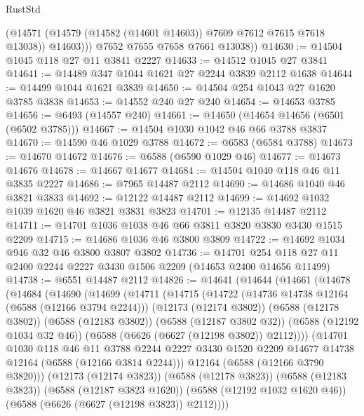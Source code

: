 \begin{lexlean}{RustStd}
\begin{coremodule}
              (@14571 (@14579 (@14582 (@14601 @14603)) @7609 @7612 @7615 @7618 @13038))
              @14603)))
        @7652
        @7655
        @7658
        @7661
        @13038))
@14630 := @14504 @1045 @118 @27 @11 @3841 @2227
@14633 := @14512 @1045 @27 @3841
@14641 := @14489 @347 @1044 @1621 @27 @2244 @3839 @2112 @1638
@14644 := @14499 @1044 @1621 @3839
@14650 := @14504 @254 @1043 @27 @1620 @3785 @3838
@14653 := @14552 @240 @27 @240
@14654 := @14653 @3785
@14656 := @6493 (@14557 @240)
@14661 := @14650 (@14654 @14656 (@6501 (@6502 @3785)))
@14667 := @14504 @1030 @1042 @46 @66 @3788 @3837
@14670 := @14590 @46 @1029 @3788
@14672 := @6583 (@6584 @3788)
@14673 := @14670 @14672
@14676 := @6588 (@6590 @1029 @46)
@14677 := @14673 @14676
@14678 := @14667 @14677
@14684 := @14504 @1040 @118 @46 @11 @3835 @2227
@14686 := @7965 @14487 @2112
@14690 := @14686 @1040 @46 @3821 @3833
@14692 := @12122 @14487 @2112
@14699 := @14692 @1032 @1039 @1620 @46 @3821 @3831 @3823
@14701 := @12135 @14487 @2112
@14711 := @14701 @1036 @1038 @46 @66 @3811 @3820 @3830 @3430 @1515 @2209
@14715 := @14686 @1036 @46 @3800 @3809
@14722 := @14692 @1034 @946 @32 @46 @3800 @3807 @3802
@14736 := @14701 @254 @118 @27 @11 @2400 @2244 @2227 @3430 @1506 @2209 (@14653 @2400 @14656 @11499)
@14738 := @6551 @14487 @2112
@14826 := @14641
    (@14644
      (@14661
        (@14678
          (@14684
            (@14690
              (@14699
                (@14711
                  (@14715
                    (@14722
                      (@14736 @14738 @12164 (@6588 (@12166 @3794 @2244)))
                      (@12173 (@12174 @3802))
                      (@6588 (@12178 @3802))
                      (@6588 (@12183 @3802))
                      (@6588 (@12187 @3802 @32))
                      (@6588 (@12192 @1034 @32 @46))
                      (@6588 (@6626 (@6627 (@12198 @3802)) @2112))))
                  (@14701
                    @1030
                    @118
                    @46
                    @11
                    @3788
                    @2244
                    @2227
                    @3430
                    @1520
                    @2209
                    @14677
                    @14738
                    @12164
                    (@6588 (@12166 @3814 @2244)))
                  @12164
                  (@6588 (@12166 @3790 @3820)))
                (@12173 (@12174 @3823))
                (@6588 (@12178 @3823))
                (@6588 (@12183 @3823))
                (@6588 (@12187 @3823 @1620))
                (@6588 (@12192 @1032 @1620 @46))
                (@6588 (@6626 (@6627 (@12198 @3823)) @2112))))

\end{coremodule}
\end{lexlean}

